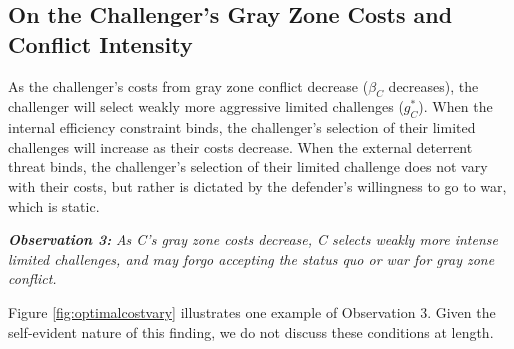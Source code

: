 \documentclass[bibtex, autowc]{apsr_submission}
\begin{document}
\subsection{On the Challenger's Gray Zone Costs and Conflict Intensity}
As the challenger's costs from gray zone conflict decrease ($\beta_{C}$ decreases), the challenger will select weakly more aggressive limited challenges ($g_{C}^{*}$). When the internal efficiency constraint binds, the challenger's selection of their limited challenges will increase as their costs decrease. When the external deterrent threat binds, the challenger's selection of their limited challenge does not vary with their costs, but rather is dictated by the defender's willingness to go to war, which is static.

\textbf{\textit{Observation 3:}}\textit{ As C's gray zone costs decrease, C selects weakly more intense limited challenges, and may forgo accepting the status quo or war for gray zone conflict.}
 
Figure \ref{fig:optimalcostvary} illustrates one example of Observation 3. Given the self-evident nature of this finding,
we do not discuss these conditions at length.
\end{document}

